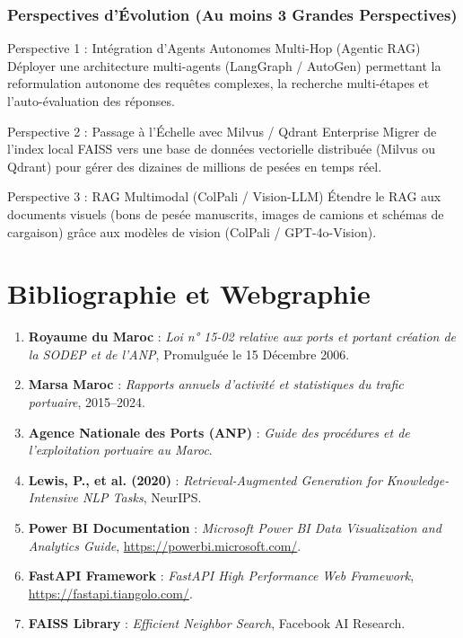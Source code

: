 \documentclass[12pt,a4paper,oneside]{report}
\begin{document}
\subsection{Perspectives d'Évolution (Au moins 3 Grandes Perspectives)}

\begin{infobox}{Perspective 1 : Intégration d'Agents Autonomes Multi-Hop (Agentic RAG)}
Déployer une architecture multi-agents (LangGraph / AutoGen) permettant la reformulation autonome des requêtes complexes, la recherche multi-étapes et l'auto-évaluation des réponses.
\end{infobox}

\begin{infobox}{Perspective 2 : Passage à l'Échelle avec Milvus / Qdrant Enterprise}
Migrer de l'index local FAISS vers une base de données vectorielle distribuée (Milvus ou Qdrant) pour gérer des dizaines de millions de pesées en temps réel.
\end{infobox}

\begin{infobox}{Perspective 3 : RAG Multimodal (ColPali / Vision-LLM)}
Étendre le RAG aux documents visuels (bons de pesée manuscrits, images de camions et schémas de cargaison) grâce aux modèles de vision (ColPali / GPT-4o-Vision).
\end{infobox}

\chapter*{Bibliographie et Webgraphie}

\begin{enumerate}
    \item \textbf{Royaume du Maroc} : \textit{Loi n° 15-02 relative aux ports et portant création de la SODEP et de l'ANP}, Promulguée le 15 Décembre 2006.
    \item \textbf{Marsa Maroc} : \textit{Rapports annuels d'activité et statistiques du trafic portuaire}, 2015–2024.
    \item \textbf{Agence Nationale des Ports (ANP)} : \textit{Guide des procédures et de l'exploitation portuaire au Maroc}.
    \item \textbf{Lewis, P., et al. (2020)} : \textit{Retrieval-Augmented Generation for Knowledge-Intensive NLP Tasks}, NeurIPS.
    \item \textbf{Power BI Documentation} : \textit{Microsoft Power BI Data Visualization and Analytics Guide}, \url{https://powerbi.microsoft.com/}.
    \item \textbf{FastAPI Framework} : \textit{FastAPI High Performance Web Framework}, \url{https://fastapi.tiangolo.com/}.
    \item \textbf{FAISS Library} : \textit{Efficient Neighbor Search}, Facebook AI Research.
\end{enumerate}
\end{document}

